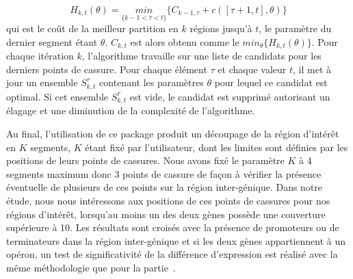 \documentclass[12pt,a4paper]{report}
\begin{document}
\begin{onehalfspace}
\[ H_{k,t}(\theta) = \underset{\{k-1<\tau<t\}}{min} \{C_{k-1,\tau} + c([\tau + 1,t],\theta)\} \]
qui est le coût de la meilleur partition en $k$ régions jusqu'à $t$, le paramètre du dernier segment étant $\theta$. $C_{k,t}$ est alors obtenu comme le $min_\theta\{H_{k,t}(\theta)\}$.
Pour chaque itération $k$, l'algorithme travaille sur une liste de candidats pour les derniers points de cassure. Pour chaque élément $\tau$ et chaque valeur $t$, il met à jour un ensemble $S_{k,t}^\tau$ contenant les paramètres $\theta$ pour lequel ce candidat est optimal. Si cet ensemble $S_{k,t}^\tau$ est vide, le candidat est supprimé autorisant un élagage et une diminution de la complexité de l'algorithme.

Au final, l'utilisation de ce package produit un découpage de la région d'intérêt en $K$ segments, $K$ étant fixé par l'utilisateur, dont les limites sont définies par les positions de leurs points de cassures. Nous avons fixé le paramètre $K$ à 4 segments maximum donc 3 points de cassure de façon à vérifier la présence éventuelle de plusieurs de ces points sur la région inter-génique.
Dans notre étude, nous nous intéressons aux positions de ces points de cassures pour nos régions d'intérêt, lorsqu'au moins un des deux gènes possède une couverture supérieure à 10. Les résultats sont croisés avec la présence de promoteurs ou de terminateurs dans la région inter-génique et si les deux gènes appartiennent à un opéron, un test de significativité de la différence d'expression est réalisé avec la même méthodologie que pour la partie~.


\end{onehalfspace}
\end{document}
